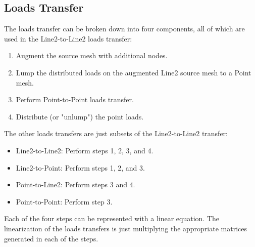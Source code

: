 \documentclass[10pt,letterpaper,oneside,notitlepage]{article}
\begin{document}
\subsection{Loads Transfer}
The loads transfer can be broken down into four components, all of which are used in the Line2-to-Line2 loads transfer:
\begin{enumerate}
  \item Augment the source mesh with additional nodes.
  \item Lump the distributed loads on the augmented Line2 source mesh to a Point mesh.
  \item Perform Point-to-Point loads transfer.
  \item Distribute (or "unlump") the point loads.   
\end{enumerate}
The other loads transfers are just subsets of the Line2-to-Line2 transfer:
\begin{itemize}
  \item Line2-to-Line2: Perform steps 1, 2, 3, and 4.
  \item Line2-to-Point: Perform steps 1, 2, and 3.
  \item Point-to-Line2: Perform steps 3 and 4.
  \item Point-to-Point: Perform step 3.
\end{itemize}


Each of the four steps can be represented with a linear equation. The linearization of the loads transfers is just multiplying the 
appropriate matrices generated in each of the steps.
\end{document}
